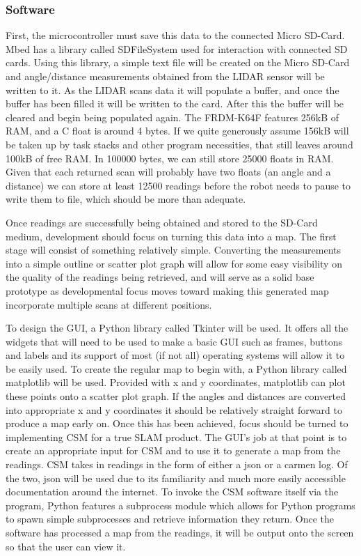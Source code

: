 				\subsubsection{Software}
				First, the microcontroller must save this data to the connected Micro SD-Card. Mbed has a library called SDFileSystem used for interaction with connected SD cards. Using this library, a simple text file will be created on the Micro SD-Card and angle/distance measurements obtained from the LIDAR sensor will be written to it. As the LIDAR scans data it will populate a buffer, and once the buffer has been filled it will be written to the card. After this the buffer will be cleared and begin being populated again. The FRDM-K64F features 256kB of RAM, and a C float is around 4 bytes. If we quite generously assume 156kB will be taken up by task stacks and other program necessities, that still leaves around 100kB of free RAM. In 100000 bytes, we can still store 25000 floats in RAM. Given that each returned scan will probably have two floats (an angle and a distance) we can store at least 12500 readings before the robot needs to pause to write them to file, which should be more than adequate.
				
				Once readings are successfully being obtained and stored to the SD-Card medium, development should focus on turning this data into a map. The first stage will consist of something relatively simple. Converting the measurements into a simple outline or scatter plot graph will allow for some easy visibility on the quality of the readings being retrieved, and will serve as a solid base prototype as developmental focus moves toward making this generated map incorporate multiple scans at different positions. 
				
				To design the GUI, a Python library called Tkinter will be used. It offers all the widgets that will need to be used to make a basic GUI such as frames, buttons and labels and its support of most (if not all) operating systems will allow it to be easily used. To create the regular map to begin with, a Python library called matplotlib will be used. Provided with x and y coordinates, matplotlib can plot these points onto a scatter plot graph. If the angles and distances are converted into appropriate x and y coordinates it should be relatively straight forward to produce a map early on. Once this has been achieved, focus should be turned to implementing CSM for a true SLAM product. The GUI's job at that point is to create an appropriate input for CSM and to use it to generate a map from the readings. CSM takes in readings in the form of either a json or a carmen log. Of the two, json will be used due to its familiarity and much more easily accessible documentation around the internet. To invoke the CSM software itself via the program, Python features a subprocess module which allows for Python programs to spawn simple subprocesses and retrieve information they return. Once the software has processed a map from the readings, it will be output onto the screen so that the user can view it.
		\newpage
		
